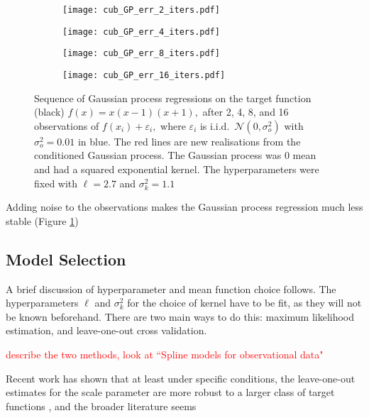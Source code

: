 \begin{figure}[htbp]
    \centering
    \begin{subfigure}[b]{0.5\textwidth}
        \centering
        \texttt{[image: cub\_GP\_err\_2\_iters.pdf]}
    \end{subfigure}%
    \hfill%
    \begin{subfigure}[b]{0.5\textwidth}
        \centering
        \texttt{[image: cub\_GP\_err\_4\_iters.pdf]}
    \end{subfigure}
    \begin{subfigure}[b]{0.5\textwidth}
        \centering
        \texttt{[image: cub\_GP\_err\_8\_iters.pdf]}
    \end{subfigure}%
    \hfill%
    \begin{subfigure}[b]{0.5\textwidth}
        \centering
        \texttt{[image: cub\_GP\_err\_16\_iters.pdf]}
    \end{subfigure}%
    \caption{
        Sequence of Gaussian process regressions on the target function
        (black) $f(x) = x(x-1)(x+1),$ after 2, 4, 8, and 16 observations of
        $f(x_i) + \varepsilon_i,$ where $\varepsilon_i$ is i.i.d.\
        $\mathcal{N}(0, \sigma^2_o)$ with $\sigma^2_o = 0.01$
        in blue. The red lines are new realisations from the conditioned
        Gaussian process. The Gaussian process was 0 mean and had a squared
        exponential kernel. The hyperparameters were fixed with $\ell = 2.7$
        and $\sigma^2_k = 1.1$
    }
    \label{fig:var_cub_reg}
\end{figure}

Adding noise to the observations makes the Gaussian process regression
much less stable (Figure \ref{fig:var_cub_reg})

\subsection*{Model Selection}

A brief discussion of hyperparameter and mean function choice follows.
The hyperparameters $\ell$ and $\sigma^2_k$ for the choice of kernel have to be
fit, as they will not be known beforehand. There are two main ways to do this:
maximum likelihood estimation, and leave-one-out cross validation. 

\textcolor{red}{describe the two methods, look at ``Spline models for observational data"}

Recent work has shown that at least under specific conditions, the 
leave-one-out estimates for the scale parameter are more robust to a larger
class of target functions \parencite{naslidnyk_comparing_2024}, and the
broader literature seems



